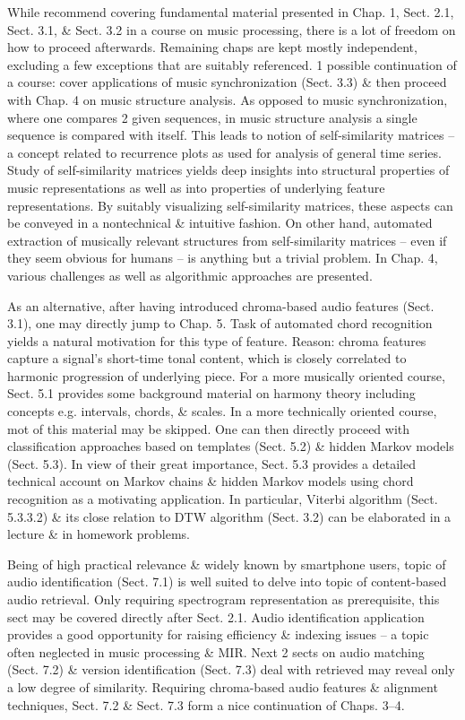 \documentclass{article}
\begin{document}
\begin{itemize}
\begin{itemize}
		While recommend covering fundamental material presented in Chap. 1, Sect. 2.1, Sect. 3.1, \& Sect. 3.2 in a course on music processing, there is a lot of freedom on how to proceed afterwards. Remaining chaps are kept mostly independent, excluding a few exceptions that are suitably referenced. 1 possible continuation of a course: cover applications of music synchronization (Sect. 3.3) \& then proceed with Chap. 4 on music structure analysis. As opposed to music synchronization, where one compares 2 given sequences, in music structure analysis a single sequence is compared with itself. This leads to notion of self-similarity matrices -- a concept related to recurrence plots as used for analysis of general time series. Study of self-similarity matrices yields deep insights into structural properties of music representations as well as into properties of underlying feature representations. By suitably visualizing self-similarity matrices, these aspects can be conveyed in a nontechnical \& intuitive fashion. On other hand, automated extraction of musically relevant structures from self-similarity matrices -- even if they seem obvious for humans -- is anything but a trivial problem. In Chap. 4, various challenges as well as algorithmic approaches are presented.
		
		As an alternative, after having introduced chroma-based audio features (Sect. 3.1), one may directly jump to Chap. 5. Task of automated chord recognition yields a natural motivation for this type of feature. Reason: chroma features capture a signal's short-time tonal content, which is closely correlated to harmonic progression of underlying piece. For a more musically oriented course, Sect. 5.1 provides some background material on harmony theory including concepts e.g. intervals, chords, \& scales. In a more technically oriented course, mot of this material may be skipped. One can then directly proceed with classification approaches based on templates (Sect. 5.2) \& hidden Markov models (Sect. 5.3). In view of their great importance, Sect. 5.3 provides a detailed technical account on Markov chains \& hidden Markov models using chord recognition as a motivating application. In particular, Viterbi algorithm (Sect. 5.3.3.2) \& its close relation to DTW algorithm (Sect. 3.2) can be elaborated in a lecture \& in homework problems.
		
		Being of high practical relevance \& widely known by smartphone users, topic of audio identification (Sect. 7.1) is well suited to delve into topic of content-based audio retrieval. Only requiring spectrogram representation as prerequisite, this sect may be covered directly after Sect. 2.1. Audio identification application provides a good opportunity for raising efficiency \& indexing issues -- a topic often neglected in music processing \& MIR. Next 2 sects on audio matching (Sect. 7.2) \& version identification (Sect. 7.3) deal with retrieved may reveal only a low degree of similarity. Requiring chroma-based audio features \& alignment techniques, Sect. 7.2 \& Sect. 7.3 form a nice continuation of Chaps. 3--4.
		

\end{itemize}
\end{itemize}
\end{document}
